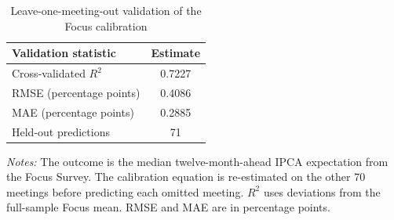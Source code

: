 \begin{table}[htbp]
\color{revisionred}
\centering
\begin{threeparttable}
\caption{Leave-one-meeting-out validation of the Focus calibration}
\label{tab:llm-loo}
\begin{footnotesize}
\begin{tabular}{p{}c}
\toprule
Validation statistic & Estimate \\
\midrule
Cross-validated $R^2$ & 0.7227 \\
RMSE (percentage points) & 0.4086 \\
MAE (percentage points) & 0.2885 \\
Held-out predictions & 71 \\
\bottomrule
\end{tabular}
\begin{tablenotes}[flushleft]
\scriptsize
\item \textit{Notes:} The outcome is the median twelve-month-ahead IPCA expectation from the Focus Survey. The calibration equation is re-estimated on the other 70 meetings before predicting each omitted meeting. $R^2$ uses deviations from the full-sample Focus mean. RMSE and MAE are in percentage points.
\end{tablenotes}
\end{footnotesize}
\end{threeparttable}
\end{table}
